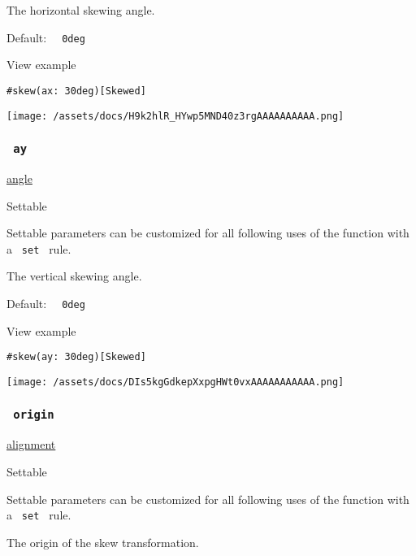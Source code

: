 The horizontal skewing angle.

Default: \texttt{\ }{\texttt{\ 0deg\ }}\texttt{\ }


View example

\begin{verbatim}
#skew(ax: 30deg)[Skewed]
\end{verbatim}

\texttt{[image: /assets/docs/H9k2hlR\_HYwp5MND40z3rgAAAAAAAAAA.png]}

\subsubsection{\texorpdfstring{\texttt{\ ay\ }}{ ay }}\label{parameters-ay}

\href{/docs/reference/layout/angle/}{angle}

{{ Settable }}

\label{parameters-ay-settable-tooltip}
Settable parameters can be customized for all following uses of the
function with a \texttt{\ set\ } rule.

The vertical skewing angle.

Default: \texttt{\ }{\texttt{\ 0deg\ }}\texttt{\ }


View example

\begin{verbatim}
#skew(ay: 30deg)[Skewed]
\end{verbatim}

\texttt{[image: /assets/docs/DIs5kgGdkepXxpgHWt0vxAAAAAAAAAAA.png]}

\subsubsection{\texorpdfstring{\texttt{\ origin\ }}{ origin }}\label{parameters-origin}

\href{/docs/reference/layout/alignment/}{alignment}

{{ Settable }}

\label{parameters-origin-settable-tooltip}
Settable parameters can be customized for all following uses of the
function with a \texttt{\ set\ } rule.

The origin of the skew transformation.

